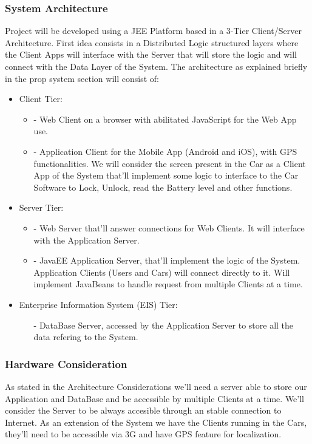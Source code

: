 \documentclass[a4paper]{article}
\begin{document}
\newpage
\subsubsection{System Architecture}
Project will be developed using a JEE Platform based in a 3-Tier Client/Server Architecture. First idea consists in a Distributed Logic structured layers where the Client Apps will interface with the Server that will store the logic and will connect with the Data Layer of the System. The architecture as explained briefly in the prop system section will consist of:
\begin {itemize}
\item Client Tier: 
\begin {itemize}
\item [-]Web Client on a browser with abilitated JavaScript for the Web App use. 
\item [-]Application Client for the Mobile App (Android and iOS), with GPS functionalities. We will consider the screen present in the Car as a Client App of the System that'll implement some logic to interface to the Car Software to Lock, Unlock, read the Battery level and other functions.
\end{itemize}

\item Server Tier:
\begin {itemize}
\item [-]Web Server that'll answer connections for Web Clients. It will interface with the Application Server.
\item [-]JavaEE Application Server, that'll implement the logic of the System. Application Clients (Users and Cars) will connect directly to it. Will implement JavaBeans to handle request from multiple Clients at a time.
\end{itemize}

\item Enterprise Information System (EIS) Tier:
\begin{itemize}
\item [-]DataBase Server, accessed by the Application Server to store all the data refering to the System.
\end{itemize}

\end{itemize}

\subsubsection{Hardware Consideration}
As stated in the Architecture Considerations we'll need a server able to store our Application and DataBase and be accessible by multiple Clients at a time. We'll consider the Server to be always accesible through an stable connection to Internet. 
As an extension of the System we have the Clients running in the Cars, they'll need to be accessible via 3G and have GPS feature for localization.
\end{document}
